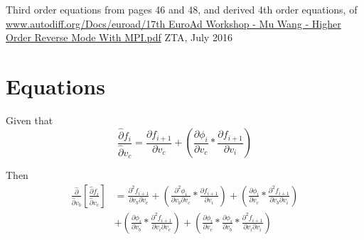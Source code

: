 \documentclass[12pt,letter]{article}
\begin{document}
	\thispagestyle{empty}
	\begin{center}
	Third order equations from pages 46 and 48, and derived 4th order equations, of
	\url{www.autodiff.org/Docs/euroad/17th EuroAd Workshop - Mu Wang - Higher Order Reverse Mode With MPI.pdf}
	ZTA, July 2016
	\end{center}
	\clearpage
	
	\newpage
	\section{Equations}
	Given that
	\begin{equation}
	\frac{\hat{\partial} f_i}{\hat{\partial} v_c} = 
	\frac{\partial f_{i+1}}{\partial v_c} + 
	\left(\frac{\partial \phi_i}{\partial v_c} * \frac{\partial f_{i+1}}{\partial v_i}\right)
	\end{equation}
	
	Then
	\begin{equation}
	\begin{split}
	\frac{\hat{\partial}}{\hat{\partial} v_b}\left[\frac{\hat{\partial} f_i}{\hat{\partial} v_c}\right]
	&=
	\frac{\partial^2 f_{i+1}}{\partial v_b \partial v_c} +
	\left(\frac{\partial^2 \phi_i}{\partial v_b \partial v_c} * \frac{\partial f_{i+1}}{\partial v_i} \right) + 
	\left(\frac{\partial\phi_i}{\partial v_c} * \frac{\partial^2 f_{i+1}}{\partial v_b \partial v_i}\right)
	\\
	&+
	\left(\frac{\partial\phi_i}{\partial v_b} * \frac{\partial^2 f_{i+1}}{\partial v_i \partial v_c}\right) + 
	\left(\frac{\partial\phi_i}{\partial v_c} * \frac{\partial\phi_i}{\partial v_b} * \frac{\partial^2 f_{i+1}}{\partial v_i \partial v_i}\right)
	\end{split}
	\end{equation}
	
\end{document}
